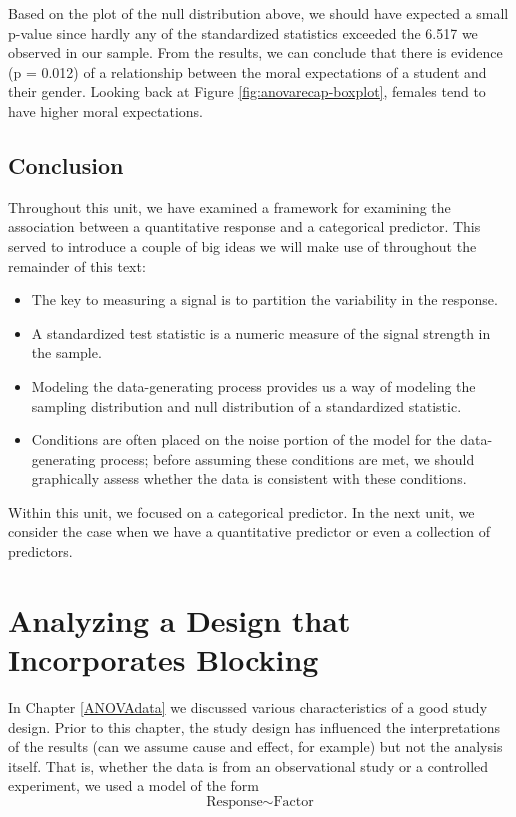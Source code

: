 \documentclass[]{book}
\providecommand{\tightlist}{%
  \setlength{\itemsep}{0pt}\setlength{\parskip}{0pt}}
\theoremstyle{definition}
\theoremstyle{definition}
\theoremstyle{remark}
\begin{document}
Based on the plot of the null distribution above, we should have
expected a small p-value since hardly any of the standardized statistics
exceeded the 6.517 we observed in our sample. From the results, we can
conclude that there is evidence (p = 0.012) of a relationship between
the moral expectations of a student and their gender. Looking back at
Figure \ref{fig:anovarecap-boxplot}, females tend to have higher moral
expectations.

\section{Conclusion}\label{conclusion}

Throughout this unit, we have examined a framework for examining the
association between a quantitative response and a categorical predictor.
This served to introduce a couple of big ideas we will make use of
throughout the remainder of this text:

\begin{itemize}
\tightlist
\item
  The key to measuring a signal is to partition the variability in the
  response.
\item
  A standardized test statistic is a numeric measure of the signal
  strength in the sample.
\item
  Modeling the data-generating process provides us a way of modeling the
  sampling distribution and null distribution of a standardized
  statistic.
\item
  Conditions are often placed on the noise portion of the model for the
  data-generating process; before assuming these conditions are met, we
  should graphically assess whether the data is consistent with these
  conditions.
\end{itemize}

Within this unit, we focused on a categorical predictor. In the next
unit, we consider the case when we have a quantitative predictor or even
a collection of predictors.

\chapter{Analyzing a Design that Incorporates
Blocking}\label{ANOVAblocking}

In Chapter \ref{ANOVAdata} we discussed various characteristics of a
good study design. Prior to this chapter, the study design has
influenced the interpretations of the results (can we assume cause and
effect, for example) but not the analysis itself. That is, whether the
data is from an observational study or a controlled experiment, we used
a model of the form \[\text{Response} \sim \text{Factor}\]
\end{document}
